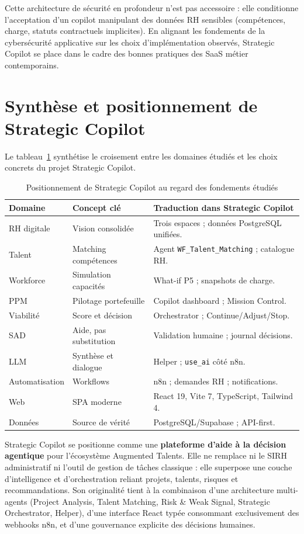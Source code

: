 Cette architecture de sécurité en profondeur n'est pas accessoire : elle conditionne l'acceptation d'un copilot manipulant des données RH sensibles (compétences, charge, statuts contractuels implicites). En alignant les fondements de la cybersécurité applicative sur les choix d'implémentation observés, Strategic Copilot se place dans le cadre des bonnes pratiques des SaaS métier contemporains.

\section{Synthèse et positionnement de Strategic Copilot}

Le tableau~\ref{tab:synthese-ch2} synthétise le croisement entre les domaines étudiés et les choix concrets du projet Strategic Copilot.

\begin{table}[htbp]
\centering
\caption{Positionnement de Strategic Copilot au regard des fondements étudiés}
\label{tab:synthese-ch2}
\begin{tabular}{@{}p{3.2cm}p{4.5cm}p{5.3cm}@{}}
\toprule
\textbf{Domaine} & \textbf{Concept clé} & \textbf{Traduction dans Strategic Copilot} \\
\midrule
RH digitale & Vision consolidée & Trois espaces ; données PostgreSQL unifiées. \\
Talent & Matching compétences & Agent \texttt{WF\_Talent\_Matching} ; catalogue RH. \\
Workforce & Simulation capacités & What-if P5 ; snapshots de charge. \\
PPM & Pilotage portefeuille & Copilot dashboard ; Mission Control. \\
Viabilité & Score et décision & Orchestrator ; Continue/Adjust/Stop. \\
SAD & Aide, pas substitution & Validation humaine ; journal décisions. \\
LLM & Synthèse et dialogue & Helper ; \texttt{use\_ai} côté n8n. \\
Automatisation & Workflows & n8n ; demandes RH ; notifications. \\
Web & SPA moderne & React 19, Vite 7, TypeScript, Tailwind 4. \\
Données & Source de vérité & PostgreSQL/Supabase ; API-first. \\
\bottomrule
\end{tabular}
\end{table}

Strategic Copilot se positionne comme une \textbf{plateforme d'aide à la décision agentique} pour l'écosystème Augmented Talents. Elle ne remplace ni le SIRH administratif ni l'outil de gestion de tâches classique : elle superpose une couche d'intelligence et d'orchestration reliant projets, talents, risques et recommandations. Son originalité tient à la combinaison d'une architecture multi-agents (Project Analysis, Talent Matching, Risk \& Weak Signal, Strategic Orchestrator, Helper), d'une interface React typée consommant exclusivement des webhooks n8n, et d'une gouvernance explicite des décisions humaines.

